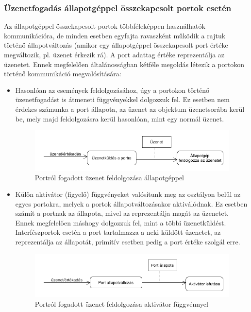 \documentclass[a4paper,12pt]{report}
\begin{document}
\subsubsection{Üzenetfogadás állapotgéppel összekapcsolt portok esetén}
Az állapotgéppel összekapcsolt portok többféleképpen használhatók kommunikációra, de minden esetben egyfajta ravaszként működik a rajtuk történő állapotváltozás (amikor egy állapotgéppel összekapcsolt port értéke megváltozik, pl. üzenet érkezik rá). A port adattag értéke reprezentálja az üzenetet. Ennek megfelelően általánosságban kétféle megoldás létezik a portokon történő kommunikáció megvalósítására:
\begin{itemize}
\item Hasonlóan az események feldolgozásához, úgy a portokon történő üzenetfogadást is átmeneti függvényekkel dolgozzuk fel. Ez esetben nem érdekes számunka a port állapota, az üzenet az objektum üzenetsorába kerül be, mely majd feldolgozásra kerül hasonlóan, mint egy normál üzenet.  \\

\begin{figure}[H]
\begin{center}
\includegraphics[scale=0.6]{port_actfun.png}
\end{center}
\caption{Portról fogadott üzenet feldolgozása állapotgéppel}
\end{figure} 

\item Külön aktivátor (figyelő) függvényeket valósítunk meg az osztályon belül az egyes portokra, melyek a portok állapotváltozásakor aktiválódnak. Ez esetben számít a portnak az állapota, mivel az reprezentálja magát az üzenetet. Ennek megfelelően máshogy dolgozzuk fel, mint a többi üzenetküldést. Interfészportok esetén a port tartalmazza a neki küldött üzenetet, az reprezentálja az állapotát, primitív esetben pedig a port értéke szolgál erre. \\


\begin{figure}[H]
\begin{center}
\includegraphics[scale=0.6]{port_sendm.png}
\end{center}
\caption{Portról fogadott üzenet feldolgozása aktivátor függvénnyel}
\end{figure} 

\end{itemize}
\end{document}
